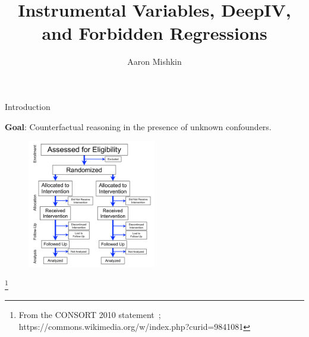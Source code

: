 \documentclass[xcolor={dvipsnames}]{beamer}
\title{Instrumental Variables, DeepIV, and Forbidden Regressions}
\author{Aaron Mishkin}
\institute{UBC MLRG 2019W2}
\date{}
\newcommand{\source}[1]{{\let\thefootnote\relax\footnote{{\tiny #1}}}}
\begin{document}
    \begin{frame}

        \titlepage

    \end{frame}

    \begin{frame}{Introduction}

            \begin{center}
                \Large \textbf{Goal}: Counterfactual reasoning in the presence of unknown confounders.
                \vspace{0.2cm}
                \begin{figure}
                    \includegraphics[width=0.5\textwidth]{figures/flow_chart}
                \end{figure}
            \end{center}

        \source{From the CONSORT 2010 statement~\citep{schulz2010consort}; https://commons.wikimedia.org/w/index.php?curid=9841081}

    \end{frame}
\end{document}
